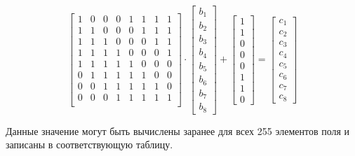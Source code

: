 \begin{equation*}
    \begin{bmatrix}
        1 & 0 & 0 & 0 & 1 & 1 & 1 & 1 \\
        1 & 1 & 0 & 0 & 0 & 1 & 1 & 1 \\
        1 & 1 & 1 & 0 & 0 & 0 & 1 & 1 \\
        1 & 1 & 1 & 1 & 0 & 0 & 0 & 1 \\
        1 & 1 & 1 & 1 & 1 & 0 & 0 & 0 \\
        0 & 1 & 1 & 1 & 1 & 1 & 0 & 0 \\
        0 & 0 & 1 & 1 & 1 & 1 & 1 & 0 \\
        0 & 0 & 0 & 1 & 1 & 1 & 1 & 1 \\
    \end{bmatrix}
    \cdot
    \begin{bmatrix}
        b_1 \\
        b_2 \\
        b_3 \\
        b_4 \\
        b_5 \\
        b_6 \\
        b_7 \\
        b_8
    \end{bmatrix}
    +
    \begin{bmatrix}
        1 \\
        1 \\
        0 \\
        0 \\
        0 \\
        1 \\
        1 \\
        0
    \end{bmatrix}
    =
    \begin{bmatrix}
        c_1 \\
        c_2 \\
        c_3 \\
        c_4 \\
        c_5 \\
        c_6 \\
        c_7 \\
        c_8
    \end{bmatrix}
\end{equation*}

Данные значение могут быть вычислены заранее для всех 255 элементов поля
и записаны в соответствующую таблицу. 


